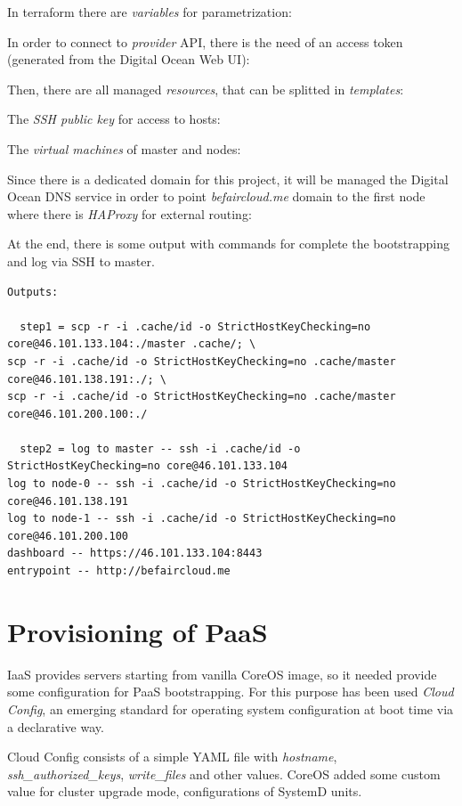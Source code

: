 In terraform there are \emph{variables} for parametrization:

In order to connect to \emph{provider} API, there is the need of an
access token (generated from the Digital Ocean Web UI):

Then, there are all managed \emph{resources}, that can be splitted in
\emph{templates}:

The \emph{SSH public key} for access to hosts:

The \emph{virtual machines} of master and nodes:

Since there is a dedicated domain for this project, it will be managed
the Digital Ocean DNS service in order to point \emph{befaircloud.me}
domain to the first node where there is \emph{HAProxy} for external
routing:

At the end, there is some output with commands for complete the
bootstrapping and log via SSH to master.

\begin{verbatim}
Outputs:

  step1 = scp -r -i .cache/id -o StrictHostKeyChecking=no core@46.101.133.104:./master .cache/; \
scp -r -i .cache/id -o StrictHostKeyChecking=no .cache/master core@46.101.138.191:./; \
scp -r -i .cache/id -o StrictHostKeyChecking=no .cache/master core@46.101.200.100:./

  step2 = log to master -- ssh -i .cache/id -o StrictHostKeyChecking=no core@46.101.133.104
log to node-0 -- ssh -i .cache/id -o StrictHostKeyChecking=no core@46.101.138.191
log to node-1 -- ssh -i .cache/id -o StrictHostKeyChecking=no core@46.101.200.100
dashboard -- https://46.101.133.104:8443
entrypoint -- http://befaircloud.me
\end{verbatim}

\section{Provisioning of PaaS}\label{provisioning-of-paas}

IaaS provides servers starting from vanilla CoreOS image, so it needed
provide some configuration for PaaS bootstrapping. For this purpose has
been used \emph{Cloud Config}, an emerging standard for operating system
configuration at boot time via a declarative way.

Cloud Config consists of a simple YAML file with \emph{hostname},
\emph{ssh\_authorized\_keys}, \emph{write\_files} and other values.
CoreOS added some custom value for cluster upgrade mode, configurations
of SystemD units.


